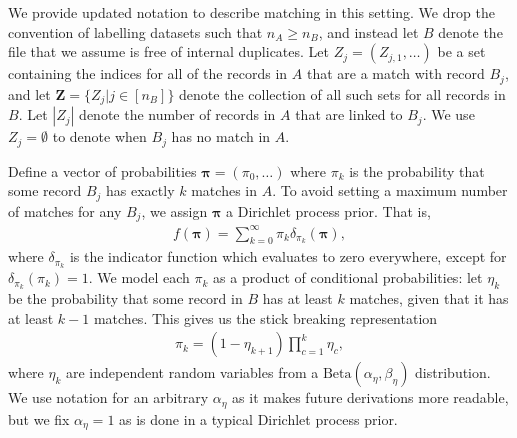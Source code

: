 \documentclass[12pt,letterpaper]{article}
\newcommand{\1}[1]{\mathbb{I}\!\left[#1\right]} %
\begin{document}
We provide updated notation to describe matching in this setting. We drop the convention of labelling datasets such that $n_A \geq n_B$, and instead let $B$ denote the file that we assume is free of internal duplicates. Let $Z_j = (Z_{j, 1}, \ldots)$ be a set containing the indices for all of the records in $A$ that are a match with record $B_j$, and let $\bm{Z} = \{Z_j | j \in [n_B] \}$ denote the collection of all such sets for all records in $B$. Let $|Z_j|$ denote the number of records in $A$ that are linked to $B_j$. We use $Z_j = \emptyset$ to denote when $B_j$ has no match in $A$. 

Define a vector of probabilities $\bm{\pi} = (\pi_0, \ldots)$ where $\pi_k$ is the probability that some record $B_j$ has exactly $k$ matches in $A$. To avoid setting a maximum number of matches for any $B_j$, we assign $\bm{\pi}$ a Dirichlet process prior. That is, 
\begin{align*}%
	f(\bm{\pi}) = \sum_{k=0}^{\infty} \pi_k \delta_{\pi_k}(\bm{\pi}),
\end{align*}
where $\delta_{\pi_k}$ is the indicator function which evaluates to zero everywhere, except for $\delta_{\pi_k}(\pi_k) = 1$. We model each $\pi_k$ as a product of conditional probabilities: let $\eta_k$ be the probability that some record in $B$ has at least $k$ matches, given that it has at least $k-1$ matches. This gives us the stick breaking representation
\begin{align}\label{eqn:pi-stick-breaking}
	\pi_k = (1 - \eta_{k+1}) \prod_{c=1}^{k} \eta_c, 
\end{align}
where $\eta_k$ are independent random variables from a $\text{Beta}(\alpha_{\eta}, \beta_{\eta})$ distribution. We use notation for an arbitrary $\alpha_{\eta}$ as it makes future derivations more readable, but we fix $\alpha_{\eta} = 1$ as is done in a typical Dirichlet process prior. 
\end{document}
